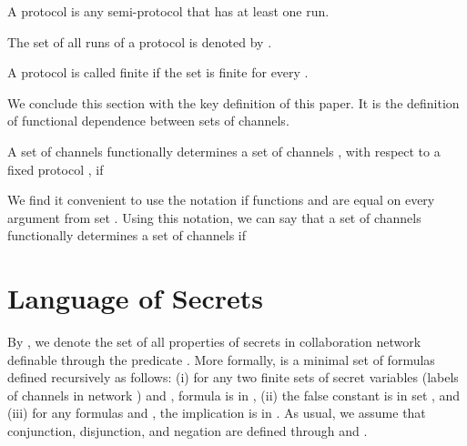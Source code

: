 \documentclass{llncs}
\begin{document}
\begin{definition}\label{protocol}
A protocol is any semi-protocol that has at least one run.
\end{definition}
The set of all runs of a protocol  is denoted by .

\begin{definition}\label{rank}
A protocol  is called finite if the set  is finite for every . 
\end{definition}

We conclude this section with the key definition of this paper. It is the definition of functional
dependence between sets of channels. 

\begin{definition}\label{dependence}
A set of channels  functionally determines a set of channels , with respect to a fixed protocol , if

\end{definition}

We find it convenient to use the notation  if functions  and  are equal on every argument from set . 
Using this notation, we can say that a set of channels  functionally determines a set of channels  if 




\section{Language of Secrets}

By , we denote the set of all properties of secrets in collaboration network  definable through the predicate .  More formally,  is a minimal set of formulas defined recursively as follows: (i)  for any two finite sets of secret variables (labels of channels in network )  and , formula  is in , (ii) the false constant  is in set , and (iii) for any formulas  and , the implication  is in . As usual, we assume that conjunction, disjunction, and negation are defined through  and . 
\end{document}

